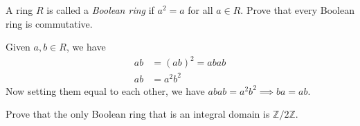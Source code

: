   \begin{exercise}[Dummit 7.1.15]
    A ring $R$ is called a \textit{Boolean ring} if $a^2 = a$ for all $a \in R$. Prove that every Boolean ring is commutative. 
  \end{exercise}
  \begin{solution}
    Given $a, b \in R$, we have 
    \begin{align}
      ab & = (ab)^2 = abab \\ 
      ab & = a^2 b^2 
    \end{align}
    Now setting them equal to each other, we have $abab = a^2 b^2 \implies ba = ab$. 
  \end{solution}

  \begin{exercise}[Dummit 7.1.16]
    Prove that the only Boolean ring that is an integral domain is $\mathbb{Z}/2\mathbb{Z}$. 
  \end{exercise}
  \begin{solution}
    
  \end{solution}

